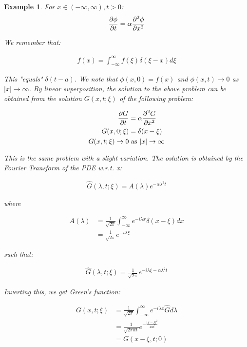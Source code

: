 \documentclass{article}
\newtheorem{ex}{Example}
\theoremstyle{definition}
\begin{document}
\begin{ex}
For $x \in (-\infty, \infty), t > 0$:
\begin{align*}
\pdv{\phi}{t} = \alpha \pdv{^2\phi}{x^2} 
\end{align*}

We remember that:

\begin{align*}
f(x) = \int_{-\infty}^{\infty}f(\xi)\delta(\xi-x) d\xi
\end{align*}

This "equals" $\delta(t-a)$. We note that $\phi(x,0) = f(x)$ and $\phi(x,t) \to 0$ as $|x| \to \infty$. By linear superposition, the solution to the above problem can be obtained from the solution $G(x,t;\xi)$ of the following problem:

\begin{align*}
\pdv{G}{t} &= \alpha \pdv{^2G}{x^2} \\
G(x,0;\xi) &= \delta(x-\xi) \\ 
G(x,t;\xi)  \to 0 &\text{ as } |x| \to \infty 
\end{align*}

This is the same problem with a slight variation. The oslution is obtained by the Fourier Transform of the PDE w.r.t. x:

\begin{align*}
\hat{G}(\lambda, t;\xi) = A(\lambda)e^{-\alpha \lambda^2 t}
\end{align*}

where 

\begin{align*}
A(\lambda) & =  \frac{1}{\sqrt{2\pi}} \int_{-\infty}^{\infty} e^{- i \lambda x} \delta(x-\xi) dx \\
& =  \frac{1}{\sqrt{2\pi}} e^{- i \lambda \xi}
\end{align*}

such that:

\begin{align*}
\hat{G}(\lambda, t;\xi)  = \frac{1}{\sqrt{2\pi}} e^{- i \lambda \xi - \alpha \lambda^2 t}
\end{align*}

Inverting this, we get Green's function:

\begin{align*}
G(x,t;\xi) &=  \frac{1}{\sqrt{2\pi}} \int_{-\infty}^{\infty} e^{- i \lambda x}\hat{G} d\lambda \\& = \frac{1}{\sqrt{2\pi \alpha t}} e^{-\frac{|x-\xi|^2}{4 \alpha t}} \\ 
& = G(x-\xi, t; 0)
\end{align*}
\end{ex}
\end{document}
